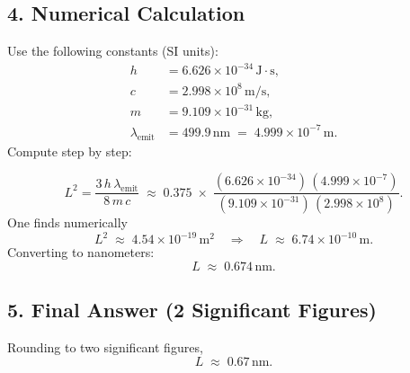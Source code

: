 \documentclass[12pt]{article}
\theoremstyle{definition} %
\theoremstyle{plain} %
\begin{document}
\subsection*{4. Numerical Calculation}

Use the following constants (SI units):
\[
\begin{aligned}
h &= 6.626\times10^{-34}\,\mathrm{J\cdot s},\\
c &= 2.998\times10^{8}\,\mathrm{m/s},\\
m &= 9.109\times10^{-31}\,\mathrm{kg},\\
\lambda_{\mathrm{emit}} &= 499.9\,\mathrm{nm} \;=\; 4.999\times10^{-7}\,\mathrm{m}.
\end{aligned}
\]
Compute step by step:

\[
L^2
= \frac{3\,h\,\lambda_{\mathrm{emit}}}{8\,m\,c}
\;\approx\;
0.375 \;\times\; \frac{(6.626\times10^{-34})\,(4.999\times10^{-7})}{(9.109\times10^{-31})\,(2.998\times10^{8})}.
\]
One finds numerically
\[
L^2 \;\approx\; 4.54\times10^{-19}\,\mathrm{m}^2
\quad\Longrightarrow\quad
L \;\approx\; 6.74\times10^{-10}\,\mathrm{m}.
\]
Converting to nanometers:
\[
L \;\approx\; 0.674\,\mathrm{nm}.
\]

\subsection*{5. Final Answer (2 Significant Figures)}

Rounding to two significant figures,
\[
\boxed{L \;\approx\; 0.67\,\mathrm{nm}.}
\]
\end{document}
